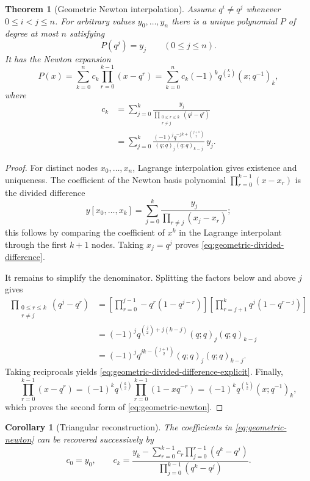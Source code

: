 \documentclass[11pt,oneside,openany]{book}
\newtheorem{theorem}{Theorem}[chapter]
\newtheorem{corollary}[corollary]{Corollary}
\theoremstyle{definition}
\theoremstyle{remark}
\begin{document}
\begin{theorem}[Geometric Newton interpolation]\label{thm:geometric-newton}
Assume $q^i\ne q^j$ whenever $0\le i<j\le n$.  For arbitrary values $y_0,\ldots,y_n$ there is a unique polynomial $P$ of degree at most $n$ satisfying
\[
 P(q^j)=y_j\qquad(0\le j\le n).
\]
It has the Newton expansion
\[
 P(x)=\sum_{k=0}^{n}c_k\prod_{r=0}^{k-1}(x-q^r)
 =\sum_{k=0}^{n}c_k(-1)^kq^{\binom k2}(x;q^{-1})_k,
 \tag{17.15}\label{eq:geometric-newton}
\]
where
\begin{align}
 c_k
 &=\sum_{j=0}^{k}
 \frac{y_j}{\prod_{\substack{0\le r\le k\\r\ne j}}(q^j-q^r)}
 \tag{17.16}\label{eq:geometric-divided-difference}\\
 &=\sum_{j=0}^{k}
 \frac{(-1)^j q^{-jk+\binom{j+1}{2}}}{(q;q)_j(q;q)_{k-j}}\,y_j.
 \tag{17.17}\label{eq:geometric-divided-difference-explicit}
\end{align}
\end{theorem}

\begin{proof}
For distinct nodes $x_0,\ldots,x_n$, Lagrange interpolation gives existence and uniqueness.  The coefficient of the Newton basis polynomial
\(
 \prod_{r=0}^{k-1}(x-x_r)
\)
is the divided difference
\[
 y[x_0,\ldots,x_k]
 =\sum_{j=0}^{k}\frac{y_j}{\prod_{r\ne j}(x_j-x_r)};
\]
this follows by comparing the coefficient of $x^k$ in the Lagrange interpolant through the first $k+1$ nodes.  Taking $x_j=q^j$ proves \eqref{eq:geometric-divided-difference}.

It remains to simplify the denominator.  Splitting the factors below and above $j$ gives
\begin{align*}
 \prod_{\substack{0\le r\le k\\r\ne j}}(q^j-q^r)
 &=\left[\prod_{r=0}^{j-1}-q^r(1-q^{j-r})\right]
   \left[\prod_{r=j+1}^{k}q^j(1-q^{r-j})\right]\\
 &=(-1)^jq^{\binom j2+j(k-j)}(q;q)_j(q;q)_{k-j}\\
 &=(-1)^jq^{jk-\binom{j+1}{2}}(q;q)_j(q;q)_{k-j}.
\end{align*}
Taking reciprocals yields \eqref{eq:geometric-divided-difference-explicit}.  Finally,
\[
 \prod_{r=0}^{k-1}(x-q^r)
 =(-1)^kq^{\binom k2}\prod_{r=0}^{k-1}(1-xq^{-r})
 =(-1)^kq^{\binom k2}(x;q^{-1})_k,
\]
which proves the second form of \eqref{eq:geometric-newton}.
\end{proof}

\begin{corollary}[Triangular reconstruction]\label{cor:geometric-triangular}
The coefficients in \eqref{eq:geometric-newton} can be recovered successively by
\[
 c_0=y_0,
 \qquad
 c_k=\frac{y_k-\sum_{r=0}^{k-1}c_r\prod_{j=0}^{r-1}(q^k-q^j)}
 {\prod_{j=0}^{k-1}(q^k-q^j)}.
 \tag{17.18}\label{eq:triangular-newton}
\]
\end{corollary}
\end{document}
